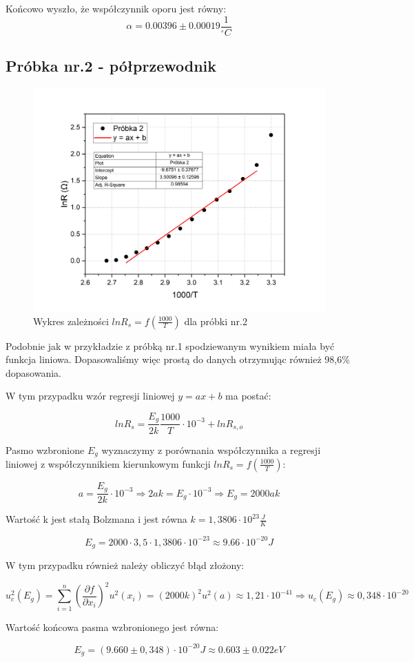 Końcowo wyszło, że współczynnik oporu jest równy:
$$\alpha = 0.00396 \pm 0.00019 \frac{1}{^{\circ}C}$$

\newpage
\subsection{Próbka nr.2 - półprzewodnik}

\begin{figure}[!ht]
    \centering
    \includegraphics[width = 150mm]{imgs/Graph2.png}
    \caption{Wykres zależności $lnR_s = f(\frac{1000}{T})$ dla próbki nr.2}
    \label{fig:polprzewodnik}
\end{figure}

Podobnie jak w przykładzie z próbką nr.1 spodziewanym wynikiem miała być funkcja liniowa.
Dopasowaliśmy więc prostą do danych otrzymując również 98,6\% dopasowania.

W tym przypadku wzór regresji liniowej $y = ax + b$ ma postać:

$$lnR_s = \frac{E_g}{2k} \frac{1000}{T} \cdot 10^{-3} + lnR_{s,o}$$

Pasmo wzbronione $E_g$ wyznaczymy z porównania współczynnika a regresji liniowej z współczynnikiem kierunkowym funkcji $lnR_s = f(\frac{1000}{T})$:

$$a = \frac{E_g}{2k} \cdot 10^{-3} \Rightarrow 2ak = E_g \cdot 10^{-3} \Rightarrow E_g = 2000ak$$

Wartość k jest stałą Bolzmana i jest równa $k = 1,3806 \cdot 10^{23} \frac{J}{K}$

$$E_g = 2000 \cdot 3,5 \cdot 1,3806 \cdot 10^{-23} \approx 9.66 \cdot 10^{-20}J$$

W tym przypadku również należy obliczyć błąd złożony:

$$u_c^2(E_g) = \displaystyle\sum_{i=1}^{n} \left( \frac{\partial f}{\partial x_i} \right)^2 u^2(x_i) = \left( 2000k \right)^2 u^2(a) \approx 1,21 \cdot 10^{-41} \Rightarrow u_c(E_g) \approx 0,348 \cdot 10^{-20}$$

Wartość końcowa pasma wzbronionego jest równa:

$$E_g = (9.660 \pm 0,348) \cdot 10^{-20}J \approx 0.603 \pm 0.022 eV$$
